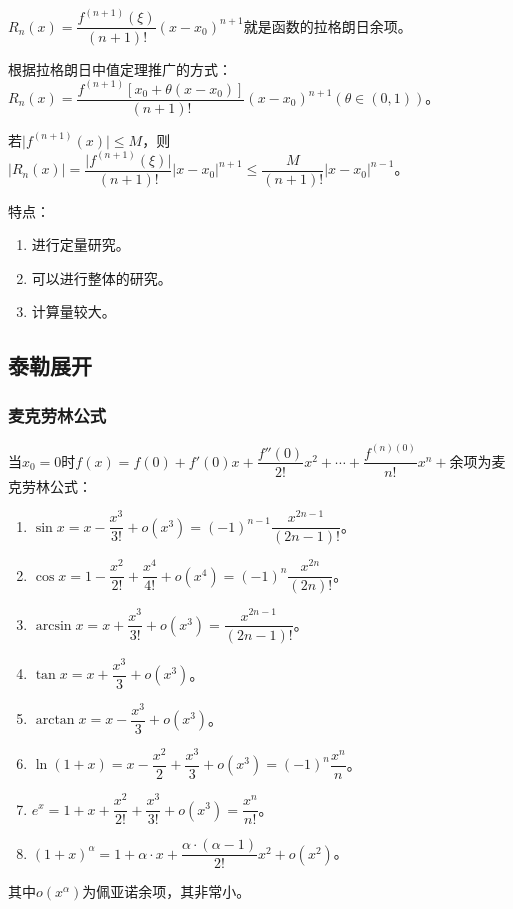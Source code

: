 \documentclass[UTF8, 12pt]{ctexart}
\begin{document}
$R_n(x)=\dfrac{f^{(n+1)}(\xi)}{(n+1)!}(x-x_0)^{n+1}$就是函数的拉格朗日余项。

根据拉格朗日中值定理推广的方式：$R_n(x)=\dfrac{f^{(n+1)}[x_0+\theta(x-x_0)]}{(n+1)!}(x-x_0)^{n+1}(\theta\in(0,1))$。

若$\vert f^{(n+1)}(x)\vert\leqslant M$，则$\vert R_n(x)\vert=\dfrac{\vert f^{(n+1)}(\xi)\vert}{(n+1)!}\vert x-x_0\vert^{n+1}\leqslant\dfrac{M}{(n+1)!}\vert x-x_0\vert^{n-1}$。

特点：

\begin{enumerate}
    \item 进行定量研究。
    \item 可以进行整体的研究。
    \item 计算量较大。
\end{enumerate}

\subsection{泰勒展开}

\subsubsection{麦克劳林公式}

当$x_0=0$时$f(x)=f(0)+f'(0)x+\dfrac{f''(0)}{2!}x^2+\cdots+\dfrac{f^{(n)(0)}}{n!}x^n+\text{余项}$为麦克劳林公式：

\begin{enumerate}
    \item $\sin x=x-\dfrac{x^3}{3!}+o(x^3)=(-1)^{n-1}\dfrac{x^{2n-1}}{(2n-1)!}$。
    \item $\cos x=1-\dfrac{x^2}{2!}+\dfrac{x^4}{4!}+o(x^4)=(-1)^n\dfrac{x^{2n}}{(2n)!}$。
    \item $\arcsin x=x+\dfrac{x^3}{3!}+o(x^3)=\dfrac{x^{2n-1}}{(2n-1)!}$。
    \item $\tan x=x+\dfrac{x^3}{3}+o(x^3)$。
    \item $\arctan x=x-\dfrac{x^3}{3}+o(x^3)$。
    \item $\ln(1+x)=x-\dfrac{x^2}{2}+\dfrac{x^3}{3}+o(x^3)=(-1)^n\dfrac{x^n}{n}$。
    \item $e^x=1+x+\dfrac{x^2}{2!}+\dfrac{x^3}{3!}+o(x^3)=\dfrac{x^n}{n!}$。
    \item $(1+x)^\alpha=1+\alpha\cdot x+\dfrac{\alpha\cdot(\alpha-1)}{2!}x^2+o(x^2)$。
\end{enumerate}

其中$o(x^\alpha)$为佩亚诺余项，其非常小。
\end{document}
